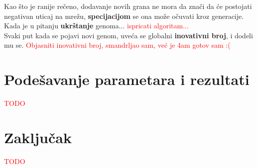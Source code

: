 \documentclass[a4paper]{article}
\begin{document}
Kao što je ranije rečeno, dodavanje novih grana ne mora da znači da će postojati negativan uticaj na mrežu, \textbf{specijacijom} se ona može očuvati kroz generacije. \\

Kada je u pitanju \textbf{ukrštanje} genoma... \textcolor{red}{ispricati algoritam...} \\

Svaki put kada se pojavi novi genom, uveća se globalni \textbf{inovativni broj}, i dodeli mu se.
\textcolor{red}{Objasniti inovativni broj, smandrljao sam, već je 4am gotov sam :(}

\section{Podešavanje parametara i rezultati}
\label{podesavanje}

\textcolor{red}{TODO}

\section{Zaključak}
\label{sec:zakljucak}

\textcolor{red}{TODO}

\pagebreak

\appendix
 

\end{document}
